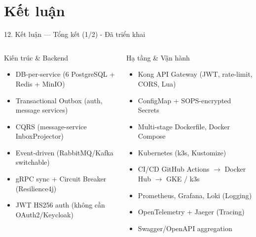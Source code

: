 \documentclass[aspectratio=169,compress]{beamer}
\begin{document}
\section{Kết luận}

\begin{frame}{12. Kết luận --- Tổng kết (1/2) - Đã triển khai}
\begin{columns}[T]
\begin{block}{Kiến trúc \& Backend}
\begin{itemize}
  \item[\checkmark] DB-per-service (6 PostgreSQL + Redis + MinIO)
  \item[\checkmark] Transactional Outbox (auth, message services)
  \item[\checkmark] CQRS (message-service InboxProjector)
  \item[\checkmark] Event-driven (RabbitMQ/Kafka switchable)
  \item[\checkmark] gRPC sync + Circuit Breaker (Resilience4j)
  \item[\checkmark] JWT HS256 auth (không cần OAuth2/Keycloak)
\end{itemize}
\end{block}

\begin{block}{Hạ tầng \& Vận hành}
\begin{itemize}
  \item[\checkmark] Kong API Gateway (JWT, rate-limit, CORS, Lua)
  \item[\checkmark] ConfigMap + SOPS-encrypted Secrets
  \item[\checkmark] Multi-stage Dockerfile, Docker Compose
  \item[\checkmark] Kubernetes (k3s, Kustomize)
  \item[\checkmark] CI/CD GitHub Actions $\rightarrow$ Docker Hub $\rightarrow$ GKE / k3s
  \item[\checkmark] Prometheus, Grafana, Loki (Logging)
  \item[\checkmark] OpenTelemetry + Jaeger (Tracing)
  \item[\checkmark] Swagger/OpenAPI aggregation
\end{itemize}
\end{block}
\end{columns}
\end{frame}
\end{document}
